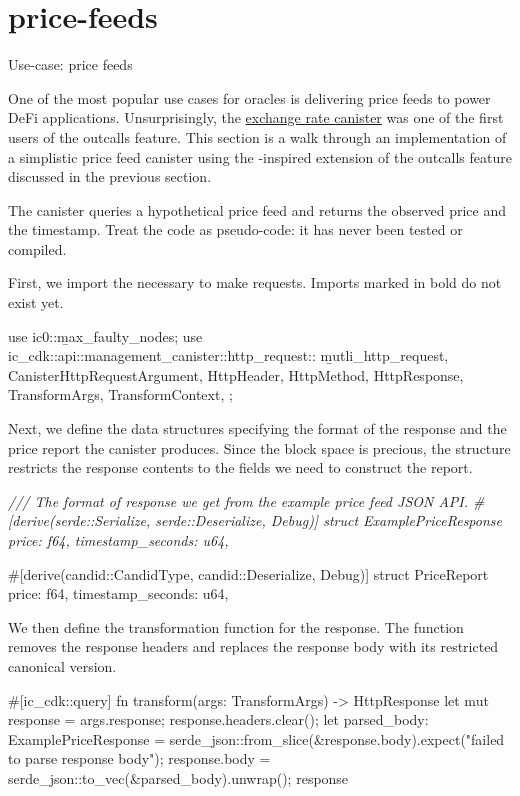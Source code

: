 \documentclass{article}
\begin{document}
\section{price-feeds}{Use-case: price feeds}

One of the most popular use cases for oracles is delivering price feeds to power DeFi applications.
Unsurprisingly, the \href{https://internetcomputer.org/docs/current/developer-docs/defi/exchange-rate-canister}{exchange rate canister} was one of the first users of the  outcalls feature.
This section is a walk through an implementation of a simplistic price feed canister using the -inspired extension of the  outcalls feature discussed in the previous section.

The canister queries a hypothetical price feed  and returns the observed price and the timestamp.
Treat the code as pseudo-code: it has never been tested or compiled.

First, we import the necessary  to make  requests.
Imports marked in bold do not exist yet.

\begin{code}[rust]
use ic0::\b{max_faulty_nodes};
use ic_cdk::api::management_canister::http_request::{
    \b{mutli_http_request},
    CanisterHttpRequestArgument, HttpHeader, HttpMethod, HttpResponse, TransformArgs,
    TransformContext,
};
\end{code}

Next, we define the data structures specifying the format of the  response and the price report the canister produces.
Since the block space is precious, the  structure restricts the response contents to the fields we need to construct the report.

\begin{code}[rust]
\em{/// The format of response we get from the example price feed JSON API.}
#[derive(serde::Serialize, serde::Deserialize, Debug)]
struct ExamplePriceResponse {
    price: f64,
    timestamp_seconds: u64,
}

#[derive(candid::CandidType, candid::Deserialize, Debug)]
struct PriceReport {
    price: f64,
    timestamp_seconds: u64,
}
\end{code}

We then define the transformation function for the  response.
The function removes the response headers and replaces the response body with its restricted canonical version.

\begin{code}[rust]
#[ic_cdk::query]
fn transform(args: TransformArgs) -> HttpResponse {
    let mut response = args.response;
    response.headers.clear();
    let parsed_body: ExamplePriceResponse =
        serde_json::from_slice(&response.body).expect("failed to parse response body");
    response.body = serde_json::to_vec(&parsed_body).unwrap();
    response
}
\end{code}
\end{document}
